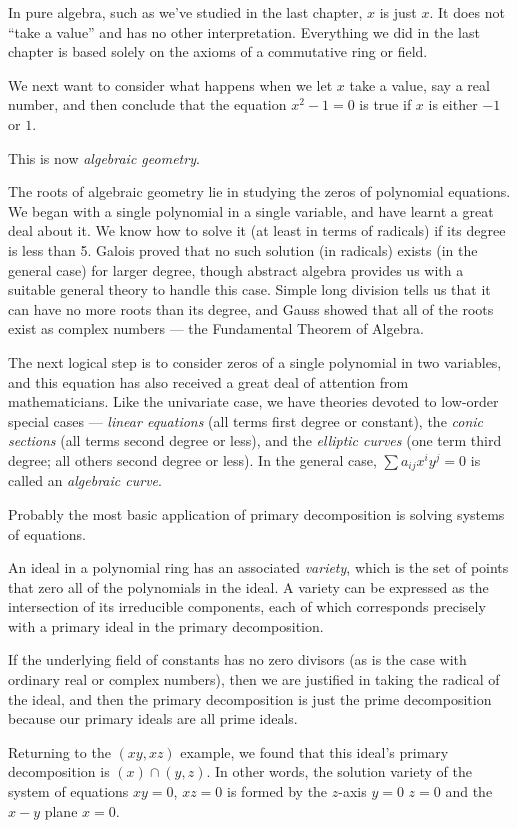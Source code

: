 

In pure algebra, such as we've studied in the last chapter, $x$ is just $x$.  It does not
``take a value'' and has no other interpretation.  Everything we did in the last chapter
is based solely on the axioms of a commutative ring or field.

We next want to consider what happens when we let $x$ take a value, say a real number,
and then conclude that the equation $x^2-1=0$ is true if $x$ is either $-1$ or $1$.

This is now {\it algebraic geometry}.

The roots of algebraic geometry lie in studying the zeros of
polynomial equations.  We began with a single polynomial in a single
variable, and have learnt a great deal about it.  We know how to solve
it (at least in terms of radicals) if its degree is less than 5.
Galois proved that no such solution (in radicals) exists (in the
general case) for larger degree, though abstract algebra provides us
with a suitable general theory to handle this case.  Simple long
division tells us that it can have no more roots than its degree, and
Gauss showed that all of the roots exist as complex numbers --- the
Fundamental Theorem of Algebra.

The next logical step is to consider zeros of a single polynomial in
two variables, and this equation has also received a great deal of
attention from mathematicians.  Like the univariate case, we have
theories devoted to low-order special cases --- {\it linear equations}
(all terms first degree or constant), the {\it conic sections} (all
terms second degree or less), and the {\it elliptic curves} (one term
third degree; all others second degree or less).  In the general case,
$\sum a_{ij} x^i y^j = 0$ is called an {\it algebraic curve}.


Probably the most basic application of primary decomposition is solving systems of equations.

An ideal in a polynomial ring has an associated {\it variety}, which is the set of points that
zero all of the polynomials in the ideal.  A variety can be expressed as the intersection of
its irreducible components, each of which corresponds precisely with a primary ideal in
the primary decomposition.

If the underlying field of constants has no zero divisors (as is the case with ordinary real
or complex numbers), then we are justified in taking the radical of the ideal, and then
the primary decomposition is just the prime decomposition because our primary ideals
are all prime ideals.

Returning to the $(xy,xz)$ example, we found that this ideal's primary decomposition
is $(x) \cap (y,z)$.  In other words, the solution variety of the system
of equations $xy=0$, $xz=0$ is formed by the $z$-axis $y=0$ $z=0$ and the $x-y$ plane $x=0$.
